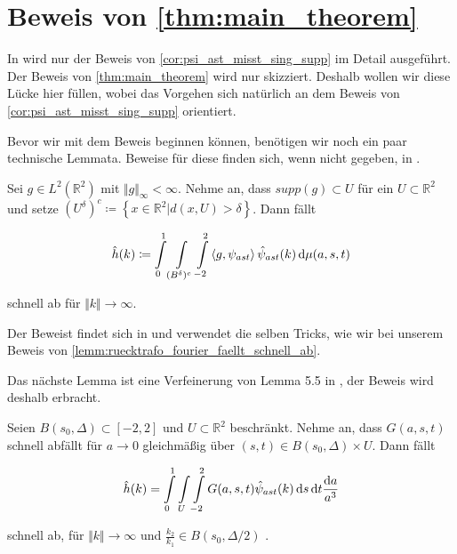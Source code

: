 \section{\texorpdfstring{Beweis von \cref{thm:main_theorem}}{Beweis des Hauptsatzes}} %
\label{sec:beweis_von_thm:main_theorem}

In \cite{Kutyniok2008} wird nur der Beweis von \cref{cor:psi_ast_misst_sing_supp} im Detail ausgeführt. Der Beweis von \cref{thm:main_theorem} wird nur skizziert. Deshalb wollen wir diese Lücke hier füllen, wobei das Vorgehen sich natürlich an dem Beweis von \cref{cor:psi_ast_misst_sing_supp} orientiert.

Bevor wir mit dem Beweis beginnen können, benötigen wir noch ein paar technische Lemmata. Beweise für diese finden sich, wenn nicht gegeben, in \cite{Kutyniok2008}.

\begin{lemma}
\label{lemm:lemma54}
    Sei $g \in L^2(\mathbb{R}^2)$ mit $\Vert g\Vert_\infty < \infty$. Nehme an, dass $supp (g) \subset U$ für ein $U \subset \mathbb{R}^2$ und setze
    $(U^\delta)^c \coloneqq \left\{x \in \mathbb{R}^2 | d(x,U) > \delta\right\}$.
    Dann fällt

    \begin{equation*}
        \hat h(k) \coloneqq \int \limits_0^1 \int \limits_{(B^\delta)^c} \int \limits_{-2}^{2} \left<g,\psi_{ast}\right> \hat \psi_{ast}(k) \mathop{}\!\mathrm{d} \mu (a,s,t)
    \end{equation*}

    schnell ab für $\Vert k \Vert \to \infty$.
\end{lemma}

Der Beweist findet sich in \cite{Kutyniok2008} und verwendet die selben Tricks, wie wir bei unserem Beweis von \cref{lemm:ruecktrafo_fourier_faellt_schnell_ab}.

Das nächste Lemma ist eine Verfeinerung von Lemma 5.5 in \textcite{Kutyniok2008}, der Beweis wird deshalb erbracht.
\begin{lemma}
\label{lemm:ruecktrafo_fourier_faellt_schnell_ab}

Seien $B(s_0,\Delta) \subset [-2,2]$ und $U \subset \mathbb{R}^2$ beschränkt. Nehme an, dass $G(a,s,t)$ schnell abfällt für $a \to 0$ gleichmäßig über $(s,t) \in  B(s_0,\Delta) \times U$. Dann fällt

\begin{equation*}
    \hat h(k) = \int \limits_0^1 \int \limits_U \int \limits_{-2}^2
    G(a,s,t) \hat \psi_{ast} (k)
        \mathop{}\!\mathrm{d} s \mathop{}\!\mathrm{d} t \frac{\mathop{}\!\mathrm{d} a}{a^3}
\end{equation*}

schnell ab, für $\Vert k \Vert \to \infty$ und $\frac{k_2}{k_1} \in B(s_0, \Delta/2)$ .
\end{lemma}

